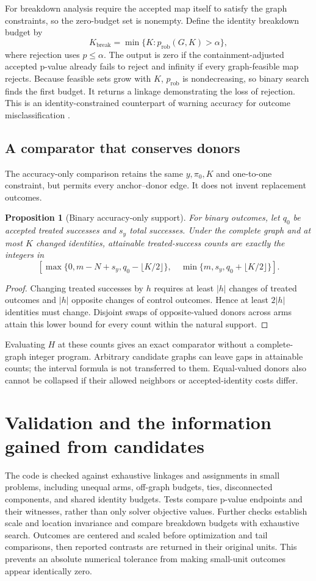 \documentclass[11pt]{article}
\newtheorem{proposition}{Proposition}
\begin{document}
For breakdown analysis require the accepted map itself to satisfy the graph
constraints, so the zero-budget set is nonempty. Define the identity breakdown budget by
\[
 K_{\mathrm{break}}=\min\{K:p_{\mathrm{rob}}(G,K)>\alpha\},
\]
where rejection uses $p\le\alpha$. The output is zero if the containment-adjusted accepted p-value already fails
to reject and infinity if every graph-feasible map rejects. Because feasible sets grow
with $K$, $p_{\mathrm{rob}}$ is nondecreasing, so binary search finds the first budget.
It returns a linkage demonstrating the loss of rejection. This is an identity-constrained
counterpart of warning accuracy for outcome misclassification \citep{heng}.

\subsection{A comparator that conserves donors}
The accuracy-only comparison retains the same $y,\pi_0,K$ and one-to-one constraint,
but permits every anchor--donor edge. It does not invent replacement outcomes.
\begin{proposition}[Binary accuracy-only support]
For binary outcomes, let $q_0$ be accepted treated successes and $s_y$ total successes.
Under the complete graph and at most $K$ changed identities, attainable treated-success
counts are exactly the integers in
\[
 \left[\max\{0,m-N+s_y,q_0-\lfloor K/2\rfloor\},\quad
 \min\{m,s_y,q_0+\lfloor K/2\rfloor\}\right].
\]
\end{proposition}
\begin{proof}
Changing treated successes by $h$ requires at least $|h|$ changes of treated outcomes
and $|h|$ opposite changes of control outcomes. Hence at least $2|h|$ identities must
change. Disjoint swaps of opposite-valued donors across arms attain this lower bound
for every count within the natural support.
\end{proof}
Evaluating $H$ at these counts gives an exact comparator without a complete-graph
integer program. Arbitrary candidate graphs can leave gaps in attainable counts;
the interval formula is not transferred to them. Equal-valued donors also cannot be
collapsed if their allowed neighbors or accepted-identity costs differ.

\section{Validation and the information gained from candidates}
The code is checked against exhaustive linkages and assignments in small problems,
including unequal arms, off-graph budgets, ties, disconnected components, and shared
identity budgets. Tests compare p-value endpoints and their witnesses, rather than
only solver objective values. Further checks establish scale and location invariance
and compare breakdown budgets with exhaustive search. Outcomes are centered and
scaled before optimization and tail comparisons, then reported contrasts are returned
in their original units. This prevents an absolute numerical tolerance from making
small-unit outcomes appear identically zero.
\end{document}
